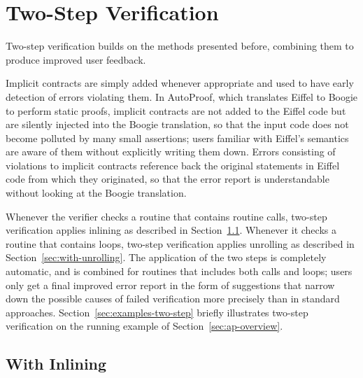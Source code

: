 \section{Two-Step Verification}
\label{sec:m-twostep}

Two-step verification builds on the methods presented before, combining them to produce improved user feedback.

Implicit contracts are simply added whenever appropriate and used to have early detection of errors violating them.
In AutoProof, which translates Eiffel to Boogie to perform static proofs, implicit contracts are not added to the Eiffel code but are silently injected into the Boogie translation, so that the input code does not become polluted by many small assertions; users familiar with Eiffel's semantics are aware of them without explicitly writing them down.
Errors consisting of violations to implicit contracts reference back the original statements in Eiffel code from which they originated, so that the error report is understandable without looking at the Boogie translation.

Whenever the verifier checks a routine that contains routine calls, two-step verification applies inlining as described in Section~\ref{sec:with-inlining}.
Whenever it checks a routine that contains loops, two-step verification applies unrolling as described in Section~\ref{sec:with-unrolling}.
The application of the two steps is completely automatic, and is combined for routines that includes both calls and loops; users only get a final improved error report in the form of suggestions that narrow down the possible causes of failed verification more precisely than in standard approaches.
Section~\ref{sec:examples-two-step} briefly illustrates two-step verification on the running example of Section~\ref{sec:ap-overview}.






\subsection{With Inlining}\label{sec:with-inlining}

